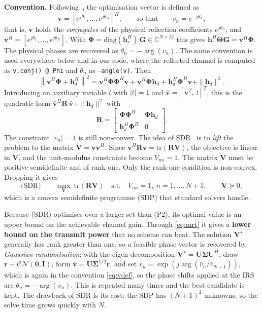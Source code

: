 \documentclass[11pt,a4paper]{article}
\newcommand{\hrv}{\bm{h}_r}
\newcommand{\hdv}{\bm{h}_d}
\newcommand{\Gm}{\bm{G}}
\newcommand{\vvec}{\bm{v}}
\newcommand{\Thm}{\bm{\Theta}}
\newcommand{\Phm}{\bm{\Phi}}
\newcommand{\Rm}{\bm{R}}
\newcommand{\Vm}{\bm{V}}
\begin{document}
\textbf{Convention.} Following~\cite[Sec.~III-A]{wu}, the optimisation vector is defined as
\begin{equation}
\vvec=\left[e^{j\theta_1},\dots,e^{j\theta_N}\right]^H,
\qquad\text{so that}\qquad v_n=e^{-j\theta_n},
\label{eq:vdef}
\end{equation}
that is, $\vvec$ holds the \emph{conjugates} of the physical reflection coefficients $e^{j\theta_n}$, and
$\vvec^H=[e^{j\theta_1},\dots,e^{j\theta_N}]$. With $\Phm=\mathrm{diag}(\hrv^H)\,\Gm\in\mathbb{C}^{N\times M}$
this gives $\hrv^H\Thm\Gm=\vvec^H\Phm$. The physical phases are recovered as $\theta_n=-\arg(v_n)$.
The same convention is used everywhere below and in our code, where the reflected channel is computed
as \texttt{v.conj() @ Phi} and $\theta_n$ as \texttt{-angle(v)}. Then
\begin{equation}
\left\|\vvec^H\Phm+\hdv^H\right\|^2 = \vvec^H\Phm\Phm^H\vvec + \vvec^H\Phm\hdv + \hdv^H\Phm^H\vvec + \|\hdv\|^2 .
\end{equation}
Introducing an auxiliary variable $t$ with $|t|=1$ and $\bar{\vvec}=[\vvec^T,\,t]^T$, this is the quadratic
form $\bar{\vvec}^H\Rm\,\bar{\vvec}+\|\hdv\|^2$ with
\begin{equation}
\Rm=\begin{bmatrix}\Phm\Phm^H & \Phm\hdv\\ \hdv^H\Phm^H & 0\end{bmatrix}.
\end{equation}
The constraint $|\bar v_n|=1$ is still non-convex. The idea of SDR~\cite{luo} is to \emph{lift} the problem to the
matrix $\Vm=\bar{\vvec}\bar{\vvec}^H$. Since $\bar{\vvec}^H\Rm\bar{\vvec}=\mathrm{tr}(\Rm\Vm)$, the objective is
linear in $\Vm$, and the unit-modulus constraints become $V_{nn}=1$. The matrix $\Vm$ must be positive
semidefinite and of rank one. Only the rank-one condition is non-convex. Dropping it gives
\begin{equation}
\text{(SDR)}\qquad \max_{\Vm}\ \mathrm{tr}(\Rm\Vm)
\quad\text{s.t.}\quad V_{nn}=1,\ n=1,\dots,N+1,\qquad \Vm\succeq 0,
\label{eq:sdr}
\end{equation}
which is a convex semidefinite programme (SDP) that standard solvers handle.

Because (SDR) optimises over a larger set than (P2), its optimal value is an upper bound on the
achievable channel gain. Through \eqref{eq:mrt} it gives a \textbf{lower bound on the transmit power}
that no scheme can beat. The solution $\Vm^\star$ generally has rank greater than one, so a feasible
phase vector is recovered by \emph{Gaussian randomisation}: with the eigen-decomposition
$\Vm^\star=\bm{U}\bm{\Sigma}\bm{U}^H$, draw $\bm{r}\sim\mathcal{CN}(\bm{0},\bm{I})$, form
$\bar{\vvec}=\bm{U}\bm{\Sigma}^{1/2}\bm{r}$, and set
$v_n=\exp\!\left(j\arg(\bar v_n/\bar v_{N+1})\right)$, which is again in the convention
\eqref{eq:vdef}, so the phase shifts applied at the IRS are $\theta_n=-\arg(v_n)$. This is repeated many times and the best
candidate is kept. The drawback of SDR is its cost: the SDP has $(N+1)^2$ unknowns, so the solve time
grows quickly with $N$.
\end{document}
